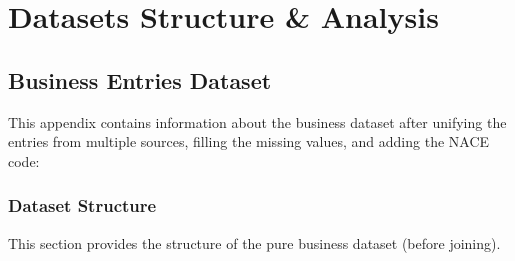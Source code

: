 
\chapter{Datasets Structure \& Analysis}


\section{Business Entries Dataset}

This appendix contains information about the business dataset after unifying the entries from multiple sources, filling the missing values, and adding the NACE code:

\subsection{Dataset Structure}

This section provides the structure of the pure business dataset (before joining).

